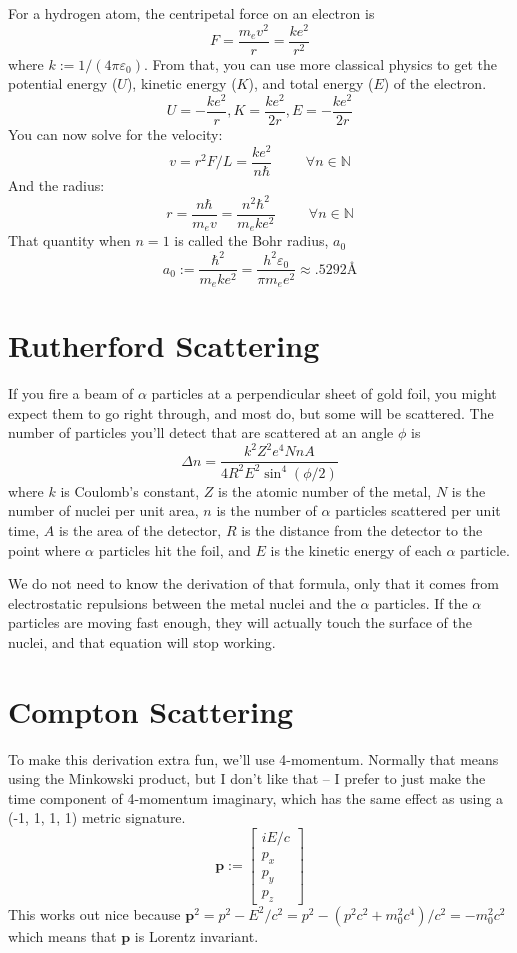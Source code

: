 \documentclass[12pt]{article}
\begin{document}
For a hydrogen atom, the centripetal force on an electron is
\[ F = \frac{m_e v^2}{r} = \frac{ke^2}{r^2} \]
where $k := 1 / (4 \pi \varepsilon_0)$. From that, you can use more classical physics to get the potential energy ($U$), kinetic energy ($K$), and total energy ($E$) of the electron.
\[ U =  - \frac{k e^2}{r} , K = \frac{k e^2}{2 r} , E = - \frac{k e^2}{2 r} \]
You can now solve for the velocity:
\[ v = r^2 F / L = \frac{k e^2}{n \hbar} \hspace{1cm} \forall n \in \mathbb{N}\]
And the radius:
\[ r = \frac{n \hbar}{m_e v} = \frac{n^2 \hbar^2}{m_e k e^2} \hspace{1cm} \forall n \in \mathbb{N} \]
That quantity when $n=1$ is called the Bohr radius, $a_0$
\[ a_0 := \frac{\hbar^2}{m_e k e^2} = \frac{h^2 \varepsilon_0}{\pi m_e e^2} \approx .5292 \text{\AA} \]

\section{Rutherford Scattering}
If you fire a beam of $\alpha$ particles at a perpendicular sheet of gold foil, you might expect them to go right through, and most do, but some will be scattered. The number of particles you'll detect that are scattered at an angle $\phi$ is
\[ \Delta n = \frac{k^2 Z^2 e^4 N n A}{4 R^2 E^2 \sin^4 (\phi / 2)} \]
where $k$ is Coulomb's constant, $Z$ is the atomic number of the metal, $N$ is the number of nuclei per unit area, $n$ is the number of $\alpha$ particles scattered per unit time, $A$ is the area of the detector, $R$ is the distance from the detector to the point where $\alpha$ particles hit the foil, and $E$ is the kinetic energy of each $\alpha$ particle.

We do not need to know the derivation of that formula, only that it comes from electrostatic repulsions between the metal nuclei and the $\alpha$ particles. If the $\alpha$ particles are moving fast enough, they will actually touch the surface of the nuclei, and that equation will stop working.

\section{Compton Scattering}
To make this derivation extra fun, we'll use 4-momentum. Normally that means using the Minkowski product, but I don't like that -- I prefer to just make the time component of 4-momentum imaginary, which has the same effect as using a (-1, 1, 1, 1) metric signature.
\[ \boldsymbol{p} := \begin{bmatrix}
    iE/c \\
    p_x \\
    p_y \\
    p_z
\end{bmatrix} \]
This works out nice because $\boldsymbol{p}^2 = p^2 - E^2/c^2 = p^2 - (p^2 c^2 + m_0^2 c^4) / c^2 = - m_0^2 c^2$ which means that $\boldsymbol{p}$ is Lorentz invariant.
\end{document}
